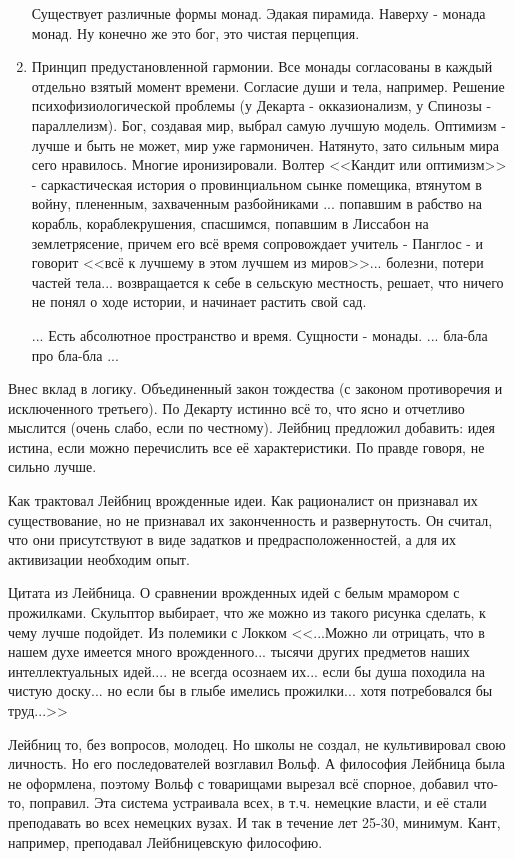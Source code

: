 \begin{enumerate}
	Существует различные формы монад. Эдакая пирамида. Наверху - монада монад. Ну конечно же это бог, это чистая перцепция.
	\item Принцип предустановленной гармонии. Все монады согласованы в каждый отдельно взятый момент времени. Согласие души и тела, например. Решение психофизиологической проблемы (у Декарта - окказионализм, у Спинозы - параллелизм). Бог, создавая мир, выбрал самую лучшую модель. Оптимизм - лучше и быть не может, мир уже гармоничен. Натянуто, зато сильным мира сего нравилось. Многие иронизировали. Волтер <<Кандит или оптимизм>> - саркастическая история о провинциальном сынке помещика, втянутом в войну, плененным, захваченным разбойниками ... попавшим в рабство на корабль, кораблекрушения, спасшимся, попавшим в Лиссабон на землетрясение, причем его всё время сопровождает учитель - Панглос - и говорит <<всё к лучшему в этом лучшем из миров>>... болезни, потери частей тела... возвращается к себе в сельскую местность, решает, что ничего не понял о ходе истории, и начинает растить свой сад. 
	\item[...] Есть абсолютное пространство и время. Сущности - монады. ... бла-бла про бла-бла ...
\end{enumerate}

Внес вклад в логику. Объединенный закон тождества (с законом противоречия и исключенного третьего). По Декарту истинно всё то, что ясно и отчетливо мыслится (очень слабо, если по честному). Лейбниц предложил добавить: идея истина, если можно перечислить все её характеристики. По правде говоря, не сильно лучше.

Как трактовал Лейбниц врожденные идеи. Как рационалист он признавал их существование, но не признавал их законченность и развернутость. Он считал, что они присутствуют в виде задатков и предрасположенностей, а для их активизации необходим опыт.

Цитата из Лейбница. О сравнении врожденных идей с белым мрамором с прожилками. Скульптор выбирает, что же можно из такого рисунка сделать, к чему лучше подойдет. Из полемики с Локком
<<...Можно ли отрицать, что в нашем духе имеется много врожденного... тысячи других предметов наших интеллектуальных идей.... не всегда осознаем их... если бы душа походила на чистую доску... но если бы в глыбе имелись прожилки... хотя потребовался бы труд...>>

Лейбниц то, без вопросов, молодец. Но школы не создал, не культивировал свою личность. Но его последователей возглавил Вольф. А философия Лейбница была не оформлена, поэтому Вольф с товарищами вырезал всё спорное, добавил что-то, поправил. Эта система устраивала всех, в т.ч. немецкие власти, и её стали преподавать во всех немецких вузах. И так в течение лет 25-30, минимум. Кант, например, преподавал Лейбницевскую философию.
 